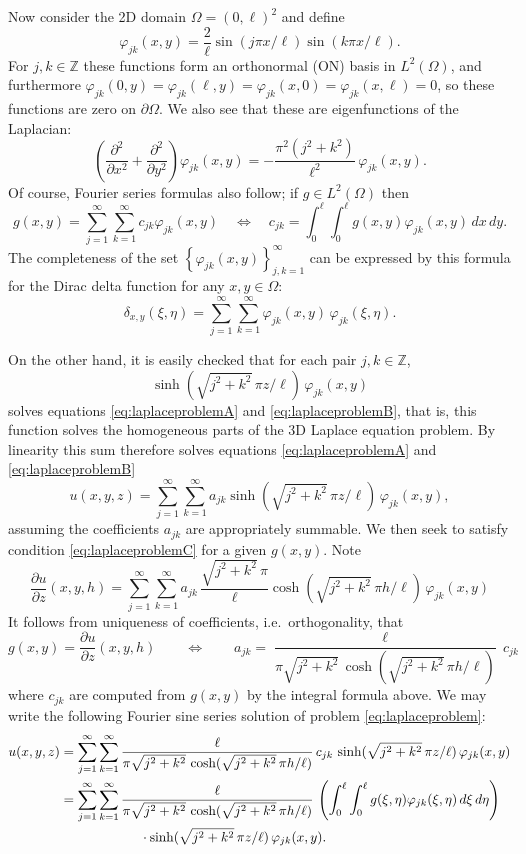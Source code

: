 \documentclass[letterpaper,final,12pt,reqno]{amsart}
\theoremstyle{cstyle}
\theoremstyle{cstyle*}
\theoremstyle{dstyle}
\numberwithin{equation}{section}
\newcommand{\ZZ}{\mathbb{Z}}
\begin{document}
Now consider the 2D domain $\Omega = (0,\ell)^2$ and define
    $$\varphi_{jk}(x,y) = \frac{2}{\ell} \sin(j\pi x/\ell) \sin(k\pi x/\ell).$$
For $j,k \in \ZZ$ these functions form an orthonormal (ON) basis in $L^2(\Omega)$, and furthermore $\varphi_{jk}(0,y)=\varphi_{jk}(\ell,y)=\varphi_{jk}(x,0)=\varphi_{jk}(x,\ell)=0$, so these functions are zero on $\partial\Omega$.  We also see that these are eigenfunctions of the Laplacian:
    $$\left(\frac{\partial^2}{\partial x^2} + \frac{\partial^2}{\partial y^2}\right) \varphi_{jk}(x,y) = - \frac{\pi^2 (j^2+k^2)}{\ell^2}\, \varphi_{jk}(x,y).$$
Of course, Fourier series formulas also follow; if $g\in L^2(\Omega)$ then
    $$g(x,y) = \sum_{j=1}^\infty \sum_{k=1}^\infty c_{jk} \varphi_{jk}(x,y) \quad \iff \quad c_{jk} = \int_0^\ell \int_0^\ell g(x,y) \varphi_{jk}(x,y)\,dx\,dy.$$
The completeness of the set $\left\{\varphi_{jk}(x,y)\right\}_{j,k=1}^\infty$ can be expressed by this formula for the Dirac delta function for any $x,y \in \Omega$:
\begin{equation}
    \delta_{x,y}(\xi,\eta) = \sum_{j=1}^\infty \sum_{k=1}^\infty \varphi_{jk}(x,y) \, \varphi_{jk}(\xi,\eta). \label{eq:app:diracdelta}
\end{equation}

On the other hand, it is easily checked that for each pair $j,k \in \ZZ$,
    $$\sinh(\sqrt{j^2+k^2}\, \pi z/\ell) \, \varphi_{jk}(x,y)$$
solves equations \eqref{eq:laplaceproblemA} and \eqref{eq:laplaceproblemB}, that is, this function solves the homogeneous parts of the 3D Laplace equation problem.  By linearity this sum therefore solves equations \eqref{eq:laplaceproblemA} and \eqref{eq:laplaceproblemB}
    $$u(x,y,z) = \sum_{j=1}^\infty \sum_{k=1}^\infty a_{jk} \sinh(\sqrt{j^2+k^2}\, \pi z/\ell)\, \varphi_{jk}(x,y),$$
assuming the coefficients $a_{jk}$ are appropriately summable.  We then seek to satisfy condition \eqref{eq:laplaceproblemC} for a given $g(x,y)$.  Note
    $$\frac{\partial u}{\partial z}(x,y,h) = \sum_{j=1}^\infty \sum_{k=1}^\infty a_{jk}\,\frac{\sqrt{j^2+k^2}\, \pi}{\ell} \cosh(\sqrt{j^2+k^2}\, \pi h/\ell) \, \varphi_{jk}(x,y)$$
It follows from uniqueness of coefficients, i.e.~orthogonality, that
    $$g(x,y) = \frac{\partial u}{\partial z}(x,y,h) \qquad \iff \qquad a_{jk} = \frac{\ell}{\pi \sqrt{j^2+k^2}\, \cosh(\sqrt{j^2+k^2}\, \pi h/\ell)} \,c_{jk}$$
where $c_{jk}$ are computed from $g(x,y)$ by the integral formula above.  We may write the following Fourier sine series solution of problem \ref{eq:laplaceproblem}:
\begin{align}
u(x,y,z) &= \sum_{j=1}^\infty \sum_{k=1}^\infty \frac{\ell}{\pi \sqrt{j^2+k^2}\, \cosh(\sqrt{j^2+k^2}\, \pi h/\ell)} \,c_{jk} \, \sinh(\sqrt{j^2+k^2}\, \pi z/\ell) \,\varphi_{jk}(x,y) \notag \\
         &= \sum_{j=1}^\infty \sum_{k=1}^\infty \frac{\ell}{\pi \sqrt{j^2+k^2}\, \cosh(\sqrt{j^2+k^2}\, \pi h/\ell)} \,\left(\int_0^\ell \int_0^\ell g(\xi,\eta) \varphi_{jk}(\xi,\eta)\,d\xi\,d\eta\right) \notag \\
         &\qquad\qquad\qquad \cdot \sinh(\sqrt{j^2+k^2}\, \pi z/\ell) \, \varphi_{jk}(x,y). \label{eq:app:laplaceproblemsoln}
\end{align}
\end{document}
